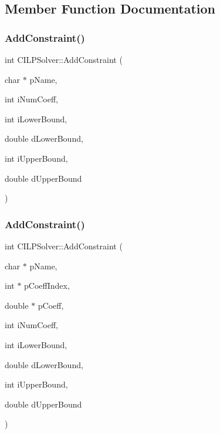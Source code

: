 \subsection{Member Function Documentation}
\mbox{\label{classCILPSolver_ac111a6eb92be7ff2b128e4da4ff6b17e}} 
\subsubsection{\texorpdfstring{AddConstraint()}{AddConstraint()}\hspace{0.1cm}{\footnotesize\ttfamily [1/2]}}
{\footnotesize\ttfamily int C\+I\+L\+P\+Solver\+::\+Add\+Constraint (\begin{DoxyParamCaption}\item[{char $\ast$}]{p\+Name,  }\item[{int}]{i\+Num\+Coeff,  }\item[{int}]{i\+Lower\+Bound,  }\item[{double}]{d\+Lower\+Bound,  }\item[{int}]{i\+Upper\+Bound,  }\item[{double}]{d\+Upper\+Bound }\end{DoxyParamCaption})}

\mbox{\label{classCILPSolver_a2bfa174a9617174504df71cff757c085}} 
\subsubsection{\texorpdfstring{AddConstraint()}{AddConstraint()}\hspace{0.1cm}{\footnotesize\ttfamily [2/2]}}
{\footnotesize\ttfamily int C\+I\+L\+P\+Solver\+::\+Add\+Constraint (\begin{DoxyParamCaption}\item[{char $\ast$}]{p\+Name,  }\item[{int $\ast$}]{p\+Coeff\+Index,  }\item[{double $\ast$}]{p\+Coeff,  }\item[{int}]{i\+Num\+Coeff,  }\item[{int}]{i\+Lower\+Bound,  }\item[{double}]{d\+Lower\+Bound,  }\item[{int}]{i\+Upper\+Bound,  }\item[{double}]{d\+Upper\+Bound }\end{DoxyParamCaption})}

